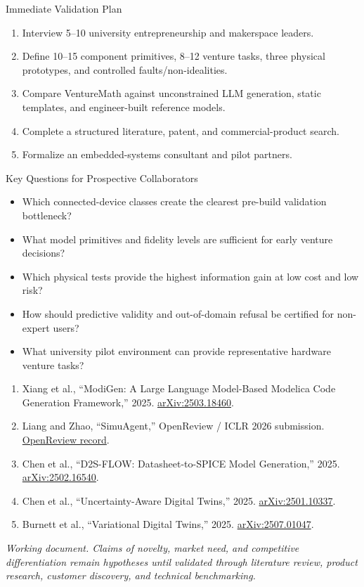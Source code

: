 \documentclass[a4paper,10pt]{article}
\newcommand{\sectiontitle}[1]{\vspace{1mm}{\fontsize{13}{14}\selectfont\bfseries\color{VMDark}#1}\par\vspace{1mm}}
\begin{document}
\begin{minipage}[t]{0.49\textwidth}
\begin{vmBox}{Immediate Validation Plan}
\begin{enumerate}
\item Interview 5--10 university entrepreneurship and makerspace leaders.
\item Define 10--15 component primitives, 8--12 venture tasks, three physical prototypes, and controlled faults/non-idealities.
\item Compare VentureMath against unconstrained LLM generation, static templates, and engineer-built reference models.
\item Complete a structured literature, patent, and commercial-product search.
\item Formalize an embedded-systems consultant and pilot partners.
\end{enumerate}
\end{vmBox}
\end{minipage}
\hfill
\begin{minipage}[t]{0.49\textwidth}
\begin{vmBox}{Key Questions for Prospective Collaborators}
\begin{itemize}
\item Which connected-device classes create the clearest pre-build validation bottleneck?
\item What model primitives and fidelity levels are sufficient for early venture decisions?
\item Which physical tests provide the highest information gain at low cost and low risk?
\item How should predictive validity and out-of-domain refusal be certified for non-expert users?
\item What university pilot environment can provide representative hardware venture tasks?
\end{itemize}
\end{vmBox}
\end{minipage}

\sectiontitle{Representative Sources}
\fontsize{7.5}{9.0}\selectfont
\begin{enumerate}
\item Xiang et al., ``ModiGen: A Large Language Model-Based Modelica Code Generation Framework,'' 2025. \href{https://arxiv.org/abs/2503.18460}{arXiv:2503.18460}.
\item Liang and Zhao, ``SimuAgent,'' OpenReview / ICLR 2026 submission. \href{https://openreview.net/forum?id=mMB3Y1ERqi}{OpenReview record}.
\item Chen et al., ``D2S-FLOW: Datasheet-to-SPICE Model Generation,'' 2025. \href{https://arxiv.org/abs/2502.16540}{arXiv:2502.16540}.
\item Chen et al., ``Uncertainty-Aware Digital Twins,'' 2025. \href{https://arxiv.org/abs/2501.10337}{arXiv:2501.10337}.
\item Burnett et al., ``Variational Digital Twins,'' 2025. \href{https://arxiv.org/abs/2507.01047}{arXiv:2507.01047}.
\end{enumerate}

\vfill
{\fontsize{7.2}{8.3}\selectfont\color{black!60}\textit{Working document. Claims of novelty, market need, and competitive differentiation remain hypotheses until validated through literature review, product research, customer discovery, and technical benchmarking.}}
\end{document}
